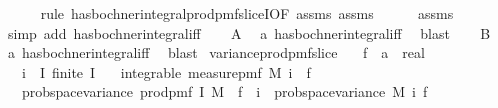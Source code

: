 \begin{isabellebody}
\ \ \ \ \isamarkupfalse%
\ {\isacharparenleft}{\kern0pt}rule\ has{\isacharunderscore}{\kern0pt}bochner{\isacharunderscore}{\kern0pt}integral{\isacharunderscore}{\kern0pt}prod{\isacharunderscore}{\kern0pt}pmf{\isacharunderscore}{\kern0pt}sliceI{\isacharbrackleft}{\kern0pt}OF\ assms{\isacharparenleft}{\kern0pt}{}{\isacharparenright}{\kern0pt}\ assms{\isacharparenleft}{\kern0pt}{}{\isacharparenright}{\kern0pt}{\isacharbrackright}{\kern0pt}{\isacharparenright}{\kern0pt}\isanewline
\ \ \ \ \isamarkupfalse%
\ assms{\isacharparenleft}{\kern0pt}{}{\isacharparenright}{\kern0pt}\ \isamarkupfalse%
\ {\isacharparenleft}{\kern0pt}simp\ add{\isacharcolon}{\kern0pt}\ has{\isacharunderscore}{\kern0pt}bochner{\isacharunderscore}{\kern0pt}integral{\isacharunderscore}{\kern0pt}iff{\isacharparenright}{\kern0pt}\isanewline
\ \ \isamarkupfalse%
\ {\isacharquery}{\kern0pt}A\ \isamarkupfalse%
\ a\ has{\isacharunderscore}{\kern0pt}bochner{\isacharunderscore}{\kern0pt}integral{\isacharunderscore}{\kern0pt}iff\ \isamarkupfalse%
\ blast\isanewline
\ \ \isamarkupfalse%
\ {\isacharquery}{\kern0pt}B\ \isamarkupfalse%
\ a\ has{\isacharunderscore}{\kern0pt}bochner{\isacharunderscore}{\kern0pt}integral{\isacharunderscore}{\kern0pt}iff\ \isamarkupfalse%
\ blast\isanewline
{}\isamarkupfalse%
%
\endisatagproof
{\isafoldproof}%
%
\isadelimproof
\isanewline
%
\endisadelimproof
\isanewline
\isanewline
{}\isamarkupfalse%
\ variance{\isacharunderscore}{\kern0pt}prod{\isacharunderscore}{\kern0pt}pmf{\isacharunderscore}{\kern0pt}slice{\isacharcolon}{\kern0pt}\isanewline
\ \ \ f\ {\isacharcolon}{\kern0pt}{\isacharcolon}{\kern0pt}\ {\isachardoublequoteopen}{\isacharprime}{\kern0pt}a\ {\isasymRightarrow}\ real{\isachardoublequoteclose}\isanewline
\ \ \ {\isachardoublequoteopen}i\ {\isasymin}\ I{\isachardoublequoteclose}\ {\isachardoublequoteopen}finite\ I{\isachardoublequoteclose}\isanewline
\ \ \ {\isachardoublequoteopen}integrable\ {\isacharparenleft}{\kern0pt}measure{\isacharunderscore}{\kern0pt}pmf\ {\isacharparenleft}{\kern0pt}M\ i{\isacharparenright}{\kern0pt}{\isacharparenright}{\kern0pt}\ {\isacharparenleft}{\kern0pt}{\isasymlambda}{\isasymomega}{\isachardot}{\kern0pt}\ f\ {\isasymomega}{\isacharcircum}{\kern0pt}{}{\isacharparenright}{\kern0pt}{\isachardoublequoteclose}\isanewline
\ \ \ {\isachardoublequoteopen}prob{\isacharunderscore}{\kern0pt}space{\isachardot}{\kern0pt}variance\ {\isacharparenleft}{\kern0pt}prod{\isacharunderscore}{\kern0pt}pmf\ I\ M{\isacharparenright}{\kern0pt}\ {\isacharparenleft}{\kern0pt}{\isasymlambda}{\isasymomega}{\isachardot}{\kern0pt}\ f\ {\isacharparenleft}{\kern0pt}{\isasymomega}\ i{\isacharparenright}{\kern0pt}{\isacharparenright}{\kern0pt}\ {\isacharequal}{\kern0pt}\ prob{\isacharunderscore}{\kern0pt}space{\isachardot}{\kern0pt}variance\ {\isacharparenleft}{\kern0pt}M\ i{\isacharparenright}{\kern0pt}\ f{\isachardoublequoteclose}\isanewline

\end{isabellebody}
